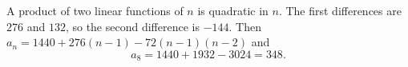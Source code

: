A product of two linear functions of $n$ is quadratic in $n$. The first differences are $276$ and $132$, so the second difference is $-144$. Then $a_n=1440+276(n-1)-72(n-1)(n-2)$ and
\[a_8=1440+1932-3024=\boxed{348}.\]
